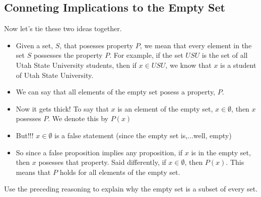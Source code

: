 \subsection*{Conneting Implications to the Empty Set}
Now let's tie these two ideas together.  
\begin{itemize}
\item Given a set, $S$, that posesses property $P$, we mean that every element in the set $S$ possesses the property $P$.  For example, if the set $USU$ is the set of all Utah State University students, then if $x\in USU$, we know that $x$ is a student of Utah State University.  
\item We can say that all elements of the empty set posess a property, $P$.
\item Now it gets thick!  To say that $x$ is an element of the empty set, $x\in \emptyset$, then $x$ posesses $P$.  We denote this by $P(x)$
\item But!!! $x\in \emptyset$ is a false statement (since the empty set is,...well, empty)
\item So since a false proposition implies any proposition,  if $x$ is in the empty set, then $x$ posesses that property.  Said differently, if $x\in\emptyset$, then $P(x)$.  This means that $P$ holds for all elements of the empty set.
\end{itemize}
\begin{problem}
Use the preceding reasoning to explain why the empty set is a subset of every set.
\vspace{1em}
\end{problem}

